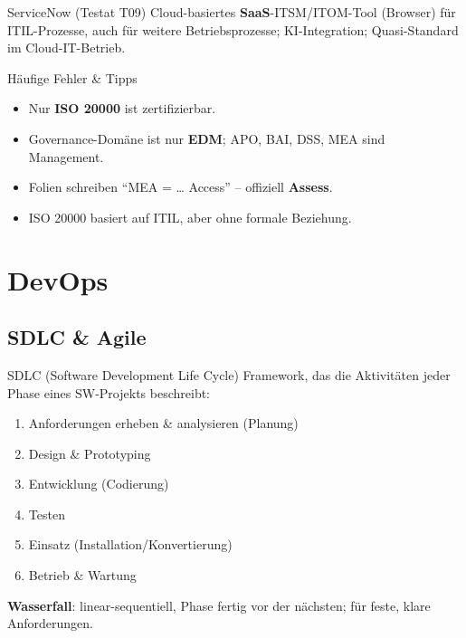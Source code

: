 \documentclass[a4paper, fontsize=7pt]{scrartcl}
\begin{document}
\begin{subbox}{ServiceNow (Testat T09)}
Cloud-basiertes \textbf{SaaS}-ITSM/ITOM-Tool (Browser) für ITIL-Prozesse,
auch für weitere Betriebsprozesse; KI-Integration; Quasi-Standard im
Cloud-IT-Betrieb.
\end{subbox}

\begin{subbox}{Häufige Fehler \& Tipps}
\begin{itemize}
    \item Nur \textbf{ISO 20000} ist zertifizierbar.
    \item Governance-Domäne ist nur \textbf{EDM}; APO, BAI, DSS, MEA sind
          Management.
    \item Folien schreiben ``MEA = \ldots{} Access'' -- offiziell
          \textbf{Assess}.
    \item ISO 20000 basiert auf ITIL, aber ohne formale Beziehung.
\end{itemize}
\end{subbox}

\section{DevOps}

\subsection{SDLC \& Agile}

\begin{mainbox}{SDLC (Software Development Life Cycle)}
Framework, das die Aktivitäten jeder Phase eines SW-Projekts beschreibt:
\begin{enumerate}
    \item Anforderungen erheben \& analysieren (Planung)
    \item Design \& Prototyping
    \item Entwicklung (Codierung)
    \item Testen
    \item Einsatz (Installation/Konvertierung)
    \item Betrieb \& Wartung
\end{enumerate}
\textbf{Wasserfall}: linear-sequentiell, Phase fertig vor der nächsten;
für feste, klare Anforderungen.
\end{mainbox}
\end{document}
